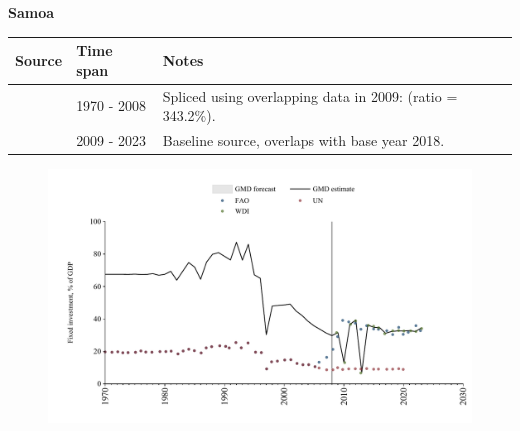 \documentclass[12pt,a4paper,landscape]{article}
\begin{document}
\begin{adjustbox}{max totalsize={\paperwidth}{\paperheight},center}
\begin{minipage}[t][\textheight][t]{\textwidth}
\vspace*{0.5cm}
{}
\begin{center}
{\Large\bfseries Samoa}
\end{center}
\vspace{0.5cm}
\begin{table}[H]
\centering
\small
\begin{tabular}{|l|l|l|}
\hline
\textbf{Source} & \textbf{Time span} & \textbf{Notes} \\
\hline
\rowcolor{white}\cite{UN}& 1970 - 2008 &Spliced using overlapping data in 2009: (ratio = 343.2\%).\\
\rowcolor{lightgray}\cite{WDI}& 2009 - 2023 &Baseline source, overlaps with base year 2018.\\
\hline
\end{tabular}
\end{table}
\begin{figure}[H]
\centering
\includegraphics[width=\textwidth,height=0.6\textheight,keepaspectratio]{graphs/WSM_finv_GDP.pdf}
\end{figure}
\end{minipage}
\end{adjustbox}
\end{document}
